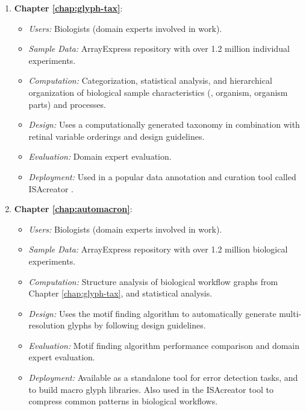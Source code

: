 \begin{enumerate}

\item \textbf{Chapter \ref{chap:glyph-tax}}:
\begin{itemize}
\item \emph{Users:} Biologists (domain experts involved in work).
\item \emph{Sample Data:} ArrayExpress \cite{ArrayExpress::2012} repository with over 1.2 million individual experiments.
\item \emph{Computation:} Categorization, statistical analysis, and hierarchical organization of biological sample characteristics (\eg, organism, organism parts) and processes.
\item \emph{Design:} Uses a computationally generated taxonomy in combination with retinal variable orderings and design guidelines.
\item \emph{Evaluation:} Domain expert evaluation.
\item \emph{Deployment:} Used in a popular data annotation and curation tool called ISAcreator \cite{rocca-serra10}.
\end{itemize}

\item \textbf{Chapter \ref{chap:automacron}}:
\begin{itemize}
\item \emph{Users:} Biologists (domain experts involved in work).
\item \emph{Sample Data:} ArrayExpress \cite{ArrayExpress::2012} repository with over 1.2 million biological experiments.
\item \emph{Computation:} Structure analysis of biological workflow graphs from Chapter \ref{chap:glyph-tax}, and statistical analysis.
\item \emph{Design:} Uses the motif finding algorithm to automatically generate multi-resolution glyphs by following design guidelines.
\item \emph{Evaluation:} Motif finding algorithm performance comparison and domain expert evaluation.
\item \emph{Deployment:} Available as a standalone tool for error detection tasks, and to build macro glyph libraries.
Also used in the ISAcreator \cite{rocca-serra10} tool to compress common patterns in biological workflows.
\end{itemize}


\end{enumerate}
